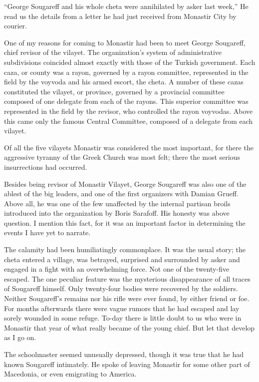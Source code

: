 \documentclass[a5paper,12pt]{book}
\begin{document}
“George Sougareff and his whole cheta were annihilated by asker last week,” He read us the details from a letter he had just received from Monastir City by courier.

One of my reasons for coming to Monastir had been to meet George Sougareff, chief revisor of the vilayet. The organization’s system of administrative subdivisions coincided almost exactly with those of the Turkish government. Each caza, or county was a rayon, governed by a rayon committee, represented in the field by the voyvoda and his armed escort, the cheta. A number of these cazas constituted the vilayet, or province, governed by a provincial committee composed of one delegate from each of the rayons. This superior committee was represented in the field by the revisor, who controlled the rayon voyvodas. Above this came only the famous Central Committee, composed of a delegate from each vilayet.

Of all the five vilayets Monastir was considered the most important, for there the aggressive tyranny of the Greek Church was most felt; there the most serious insurrections had occurred.

Besides being revisor of Monastir Vilayet, George Sougareff was also one of the ablest of the big leaders, and one of the first organizers with Damian Grueff. Above all, he was one of the few unaffected by the internal partisan broils introduced into the organization by Boris Sarafoff. His honesty was above question. I mention this fact, for it was an important factor in determining the events I have yet to narrate.

The calamity had been humiliatingly commonplace. It was the usual story; the cheta entered a village, was betrayed, surprised and surrounded by asker and engaged in a fight with an overwhelming force. Not one of the twenty-five escaped. The one peculiar feature was the mysterious disappearance of all traces of Sougareff himself. Only twenty-four bodies were recovered by the soldiers. Neither Sougareff’s remains nor his rifle were ever found, by either friend or foe. For months afterwards there were vague rumors that he had escaped and lay sorely wounded in some refuge. To-day there is little doubt to us who were in Monastir that year of what really became of the young chief. But let that develop as I go on.

The schoolmaster seemed unusually depressed, though it was true that he had known Sougareff intimately. He spoke of leaving Monastir for some other part of Macedonia, or even emigrating to America.
\end{document}
